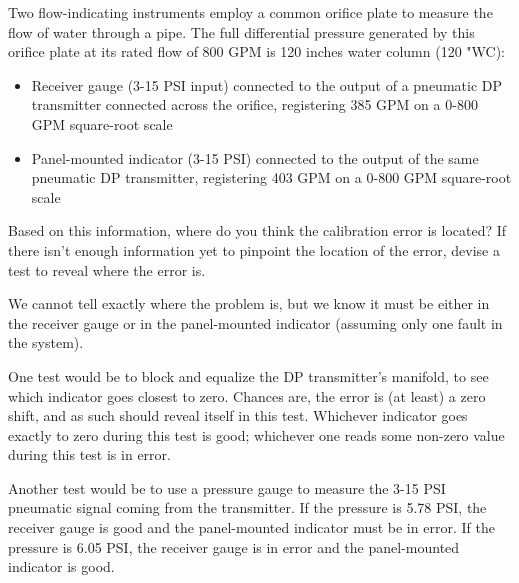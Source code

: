 

Two flow-indicating instruments employ a common orifice plate to measure the flow of water through a pipe.  The full differential pressure generated by this orifice plate at its rated flow of 800 GPM is 120 inches water column (120 "WC):

\vskip 10pt

\begin{itemize}
\item{} Receiver gauge (3-15 PSI input) connected to the output of a pneumatic DP transmitter connected across the orifice, registering 385 GPM on a 0-800 GPM square-root scale
\vskip 10pt
\item{} Panel-mounted indicator (3-15 PSI) connected to the output of the same pneumatic DP transmitter, registering 403 GPM on a 0-800 GPM square-root scale
\end{itemize}

\vskip 10pt

Based on this information, where do you think the calibration error is located?  If there isn't enough information yet to pinpoint the location of the error, devise a test to reveal where the error is.







We cannot tell exactly where the problem is, but we know it must be either in the receiver gauge or in the panel-mounted indicator (assuming only one fault in the system).

\vskip 10pt

One test would be to block and equalize the DP transmitter's manifold, to see which indicator goes closest to zero.  Chances are, the error is (at least) a zero shift, and as such should reveal itself in this test.  Whichever indicator goes exactly to zero during this test is good; whichever one reads some non-zero value during this test is in error.

\vskip 10pt

Another test would be to use a pressure gauge to measure the 3-15 PSI pneumatic signal coming from the transmitter.  If the pressure is 5.78 PSI, the receiver gauge is good and the panel-mounted indicator must be in error.  If the pressure is 6.05 PSI, the receiver gauge is in error and the panel-mounted indicator is good.











